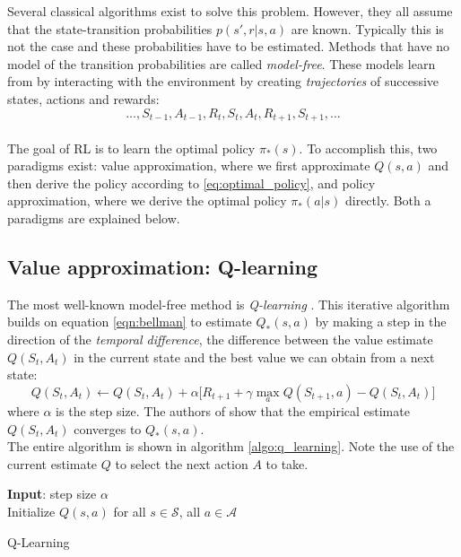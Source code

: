 Several classical algorithms exist to solve this problem. However, they all assume that the state-transition probabilities $p(s', r | s, a)$ are known. Typically this is not the case and these probabilities have to be estimated. Methods that have no model of the transition probabilities are called \emph{model-free}. These models learn from by interacting with the environment by creating \emph{trajectories} of successive states, actions and rewards:
$$
\ldots, S_{t-1}, A_{t-1}, R_t, S_t, A_t, R_{t+1}, S_{t+1}, \ldots
$$
\\
The goal of RL is to learn the optimal policy $\pi_{*}(s)$. To accomplish this, two paradigms exist: value approximation, where we first approximate $Q(s,a)$ and then derive the policy according to \ref{eq:optimal_policy}, and policy approximation, where we derive the optimal policy $\pi_{*}(a|s)$ directly. Both a paradigms are explained below.
\subsection{Value approximation: Q-learning}
\label{sec:intro_q_learning}
The most well-known model-free method is \emph{Q-learning} \cite{watkins1989learning}. This iterative algorithm builds on equation \ref{eqn:bellman} to estimate $Q_{*}(s,a)$ by making a step in the direction of the \emph{temporal difference}, the difference between the value estimate $Q(S_t, A_t)$ in the current state and the best value we can obtain from a next state:
\begin{equation}
    Q(S_t, A_t) \leftarrow Q(S_t, A_t) + \alpha \big[R_{t+1} + \gamma \max_{a} Q(S_{t+1}, a) - Q(S_t, A_t) \big]
    \label{eqn:q_learning}
\end{equation}
where $\alpha$ is the step size. The authors of \cite{watkins1992q} show that the empirical estimate $Q(S_t, A_t)$ converges to $Q_{*}(s,a)$.\\

The entire algorithm is shown in algorithm \ref{algo:q_learning}. Note the use of the current estimate $Q$ to select the next action $A$ to take.

\begin{algorithm}[H]
\SetAlgoLined
\textbf{Input}:  step size $\alpha$\\
Initialize $Q(s,a)$ for all $s \in \mathcal{S}$, all $a \in \mathcal{A}$\\
 \caption{Q-Learning}
 \label{algo:q_learning}
\end{algorithm}

